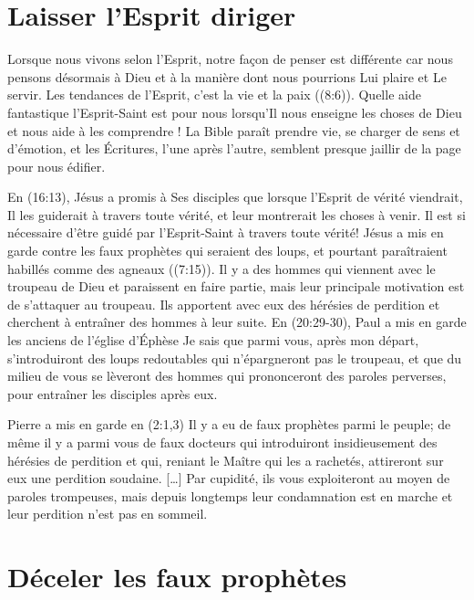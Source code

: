 \section{Laisser l'Esprit diriger}

Lorsque nous vivons selon l'Esprit, notre façon de penser est différente
 car nous pensons désormais à Dieu et à la manière dont nous pourrions
 Lui plaire et Le servir.
 Les tendances de l'Esprit, c'est la vie et la paix ((8:6)).
 Quelle aide fantastique l'Esprit-Saint est pour nous lorsqu'Il nous enseigne
 les choses de Dieu et nous aide à les comprendre !
 La Bible paraît prendre vie, se charger de sens et d'émotion,
 et les Écritures, l'une après l'autre, semblent presque jaillir
 de la page pour nous édifier.

En (16:13), Jésus a promis à Ses disciples
 que lorsque l'Esprit de vérité viendrait,
 Il les guiderait à travers toute vérité,
 et leur montrerait les choses à venir.
 Il est si nécessaire d'être guidé par l'Esprit-Saint
 à travers toute vérité!
 Jésus a mis en garde contre les faux prophètes qui seraient des loups,
 et pourtant paraîtraient habillés comme des agneaux ((7:15)).
 Il y a des hommes qui viennent avec le troupeau de Dieu
 et paraissent en faire partie, mais leur principale motivation
 est de s'attaquer au troupeau.
 Ils apportent avec eux des hérésies de perdition
 et cherchent à entraîner des hommes à leur suite.
 En (20:29-30),
 Paul a mis en garde les anciens de l'église d'Éphèse\frcolon{}
 \Og Je sais que parmi vous, après mon départ,
 s'introduiront des loups redoutables
 qui n'épargneront pas le troupeau,
 et que du milieu de vous se lèveront des hommes
 qui prononceront des paroles perverses,
 pour entraîner les disciples après eux. \Fg{}

Pierre a mis en garde en (2:1,3)\frcolon{}
 \Og Il y a eu de faux prophètes parmi le peuple;
 de même il y a parmi vous de faux docteurs
 qui introduiront insidieusement des hérésies de perdition et qui,
 reniant le Maître qui les a rachetés,
 attireront sur eux une perdition soudaine. [\dots{}]
 Par cupidité, ils vous exploiteront au moyen de paroles trompeuses,
 mais depuis longtemps leur condamnation est en marche
 et leur perdition n'est pas en sommeil. \Fg{}


\section{D\'eceler les faux proph\`etes}

